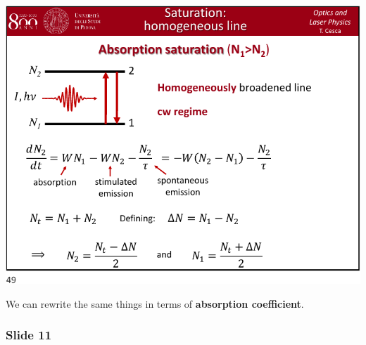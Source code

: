 \documentclass[../main/main.tex]{subfiles}
\begin{document}
\begin{minipage}[]{0.5\linewidth}
\centering
\includegraphics[page=10,width=1\textwidth]{../lessons/pdf_file/10_lecture.pdf}
\end{minipage}
\hspace{0.3cm}\vspace{0.3cm}
\begin{minipage}[c]{0.47\linewidth}

We can rewrite the same things in terms of \textbf{absorption coefficient}.

\end{minipage}

\subsubsection*{Slide 11}
\end{document}
